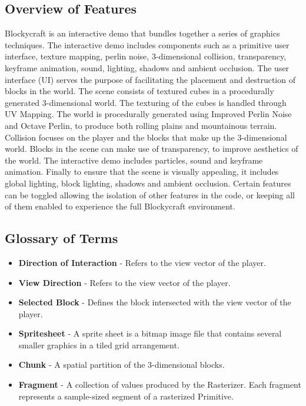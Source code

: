 \documentclass[a4paper,11pt,titlepage]{scrartcl}
\newcommand{\Blockycraft}{Blockycraft}
\begin{document}
\subsection{Overview of Features}
\Blockycraft{} is an interactive demo that bundles together a series of graphics techniques.  The interactive demo includes components such as a primitive user interface, texture mapping, perlin noise, 3-dimensional collision, transparency, keyframe animation, sound, lighting, shadows and ambient occlusion.  The user interface (UI) serves the purpose of facilitating the placement and destruction of blocks in the world.  The scene consists of textured cubes in a procedurally generated 3-dimensional world.  The texturing of the cubes is handled through UV Mapping.  The world is procedurally generated using Improved Perlin Noise and Octave Perlin, to produce both rolling plains and mountainous terrain.  Collision focuses on the player and the blocks that make up the 3-dimensional world.  Blocks in the scene can make use of transparency, to improve aesthetics of the world.  The interactive demo includes particles, sound and keyframe animation.  Finally to ensure that the scene is visually appealing, it includes global lighting, block lighting, shadows and ambient occlusion.  Certain features can be toggled allowing the isolation of other features in the code, or keeping all of them enabled to experience the full \Blockycraft{} environment.

\subsection{Glossary of Terms}
\begin{itemize}
\item \textbf{Direction of Interaction} - Refers to the view vector of the player.
\item \textbf{View Direction} - Refers to the view vector of the player.
\item \textbf{Selected Block} - Defines the block intersected with the view vector of the player.
\item \textbf{Spritesheet} - A sprite sheet is a bitmap image file that contains several smaller graphics in a tiled grid arrangement.
\item \textbf{Chunk} - A spatial partition of the 3-dimensional blocks.
\item \textbf{Fragment} - A collection of values produced by the Rasterizer. Each fragment represents a sample-sized segment of a rasterized Primitive.
\end{itemize}
\end{document}
